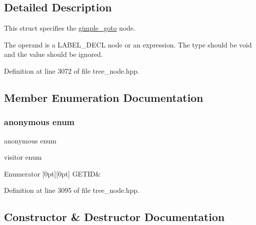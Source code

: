 \subsection{Detailed Description}
This struct specifies the \hyperlink{structgimple__goto}{gimple\+\_\+goto} node. 

The operand is a L\+A\+B\+E\+L\+\_\+\+D\+E\+CL node or an expression. The type should be void and the value should be ignored. 

Definition at line 3072 of file tree\+\_\+node.\+hpp.



\subsection{Member Enumeration Documentation}
\mbox{\label{structgimple__goto_a2a1bdfae18442f51c50d1d6fa66450cb}} 
\subsubsection{\texorpdfstring{anonymous enum}{anonymous enum}}
{\footnotesize\ttfamily anonymous enum}



visitor enum 

\begin{DoxyEnumFields}{Enumerator}
[0pt][0pt]{}\mbox{\label{structgimple__goto_a2a1bdfae18442f51c50d1d6fa66450cba935a81b29810df4251e057e4763980ab}} 
G\+E\+T\+ID&\\
\hline

\end{DoxyEnumFields}


Definition at line 3095 of file tree\+\_\+node.\+hpp.



\subsection{Constructor \& Destructor Documentation}
\mbox{\label{structgimple__goto_a5d49b12cbf733ff6706d72931e2b04ee}} 
